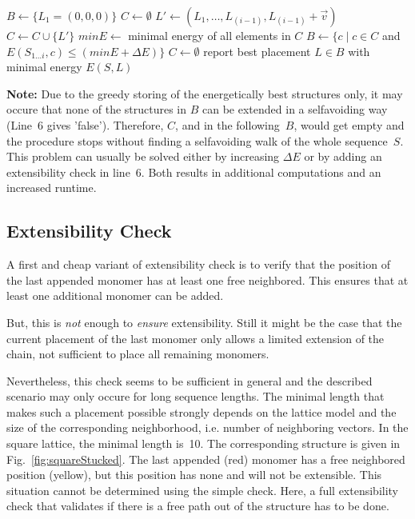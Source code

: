 \documentclass{article}
\begin{document}
\vspace{0.5em}
\begin{algorithmic}[1]
	\State $B \gets \{L_1=(0,0,0)\}$  \Statex {}
	\State $C \gets \emptyset$ 
		 
					\State $L' \gets (L_1,\ldots,L_{(i-1)},L_{(i-1)} + \vec v)$
					\State $C \gets C \cup \{L'\}$
				\EndIf
			\EndFor
		\EndFor
		\State $minE \gets $ minimal energy of all elements in $C$ 
		\State $B \gets \{ c \;|\; c\in C $ and $E(S_{1\ldots i},c) \leq (minE+\Delta
		E)\}$
		\State $C \gets \emptyset$ 
	\EndFor
	\State report best placement $L \in B$ with minimal energy $E(S,L)$
\end{algorithmic}

\vspace{1em}
{\bfseries Note:} Due to the greedy storing of the energetically best structures
only, it may occure that none of the structures in $B$ can be extended in a
selfavoiding way (Line~6 gives 'false'). Therefore, $C$, and in the
following~$B$, would get empty and the procedure stops without finding a
selfavoiding walk of the whole sequence~$S$. This problem can usually be solved
either by increasing $\Delta E$ or by adding an extensibility check in line~6.
Both results in additional computations and an increased runtime.


\subsection{Extensibility Check}
\label{sec:endCheck}

A first and cheap variant of extensibility check is to verify that the
position of the last appended monomer has at least one free neighbored. This
ensures that at least one additional monomer can be added.

But, this is \emph{not} enough to \emph{ensure} extensibility. Still it
might be the case that the current placement of the last monomer only allows a
limited extension of the chain, not sufficient to place all remaining monomers.

Nevertheless, this check seems to be sufficient in general and the described
scenario may only occure for long sequence lengths. The minimal length that
makes such a placement possible strongly depends on the lattice model and the
size of the corresponding neighborhood, i.e. number of neighboring vectors. In
the square lattice, the minimal length is~10. The corresponding structure is
given in Fig.~\ref{fig:squareStucked}. The last appended (red) monomer has a
free neighbored position (yellow), but this position has none and will not be
extensible. This situation cannot be determined using the simple check. Here, a
full extensibility check that validates if there is a free path out of the
structure has to be done.
\end{document}
